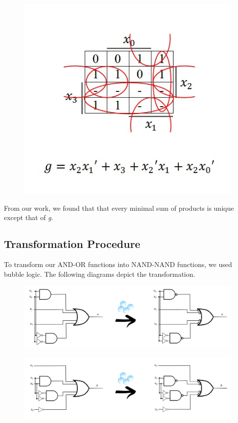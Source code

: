 \documentclass{article}
\begin{document}
\begin{figure}[h!]
\centering
\includegraphics[scale=0.6]{g-KMap}
\end{figure}

\pagebreak

From our work, we found that that every minimal sum of products is unique 
except that of \textit{g}.


\subsection{Transformation Procedure}
To transform our AND-OR functions into NAND-NAND functions, we used bubble 
logic. The following diagrams depict the transformation.

\begin{figure}[hp]
\centering
\includegraphics[scale=0.25]{a-transformation}
\end{figure}

\begin{figure}[hp]
\centering
\includegraphics[scale=0.25]{b-transformation}
\end{figure}
\end{document}
